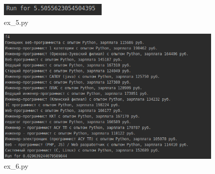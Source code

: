 \documentclass{article}
\begin{document}
\begin{figure}[h!]
    \centering
    \includegraphics[width=\textwidth]{ex5.png}
    \caption{ex\_5.py}
    \label{fig: ex5}
\end{figure}
\begin{figure}[h!]
    \centering
    \includegraphics[width=\textwidth]{ex6.png}
    \caption{ex\_6.py}
    \label{fig: ex6}
\end{figure}
\end{document}
